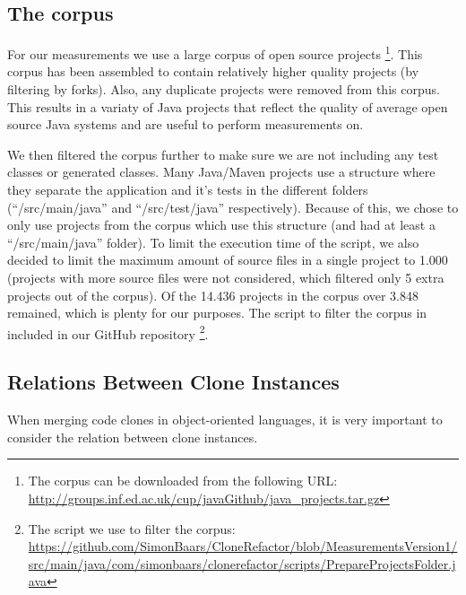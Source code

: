 \documentclass[a4paper]{article}
\begin{document}
\subsection{The corpus}
For our measurements we use a large corpus of open source projects \cite{githubCorpus2013}\footnote{The corpus can be downloaded from the following URL: \url{http://groups.inf.ed.ac.uk/cup/javaGithub/java_projects.tar.gz}}. This corpus has been assembled to contain relatively higher quality projects (by filtering by forks). Also, any duplicate projects were removed from this corpus. This results in a variaty of Java projects that reflect the quality of average open source Java systems and are useful to perform measurements on.

We then filtered the corpus further to make sure we are not including any test classes or generated classes. Many Java/Maven projects use a structure where they separate the application and it's tests in the different folders (``/src/main/java'' and ``/src/test/java'' respectively). Because of this, we chose to only use projects from the corpus which use this structure (and had at least a ``/src/main/java'' folder). To limit the execution time of the script, we also decided to limit the maximum amount of source files in a single project to 1.000 (projects with more source files were not considered, which filtered only 5 extra projects out of the corpus). Of the 14.436 projects in the corpus over 3.848 remained, which is plenty for our purposes. The script to filter the corpus in included in our GitHub repository \footnote{The script we use to filter the corpus: \url{https://github.com/SimonBaars/CloneRefactor/blob/MeasurementsVersion1/src/main/java/com/simonbaars/clonerefactor/scripts/PrepareProjectsFolder.java}}.

\subsection{Relations Between Clone Instances}
When merging code clones in object-oriented languages, it is very important to consider the relation between clone instances.
\end{document}
